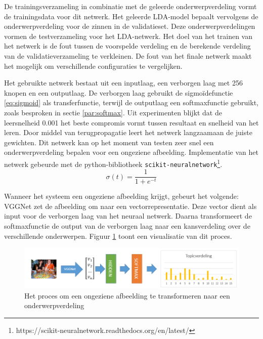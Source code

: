 De trainingsverzameling in combinatie met de geleerde onderwerpverdeling vormt de trainingsdata voor dit netwerk. 
Het geleerde LDA-model bepaalt vervolgens de onderwerpverdeling voor de zinnen in de validatieset. Deze onderwerpverdelingen vormen de testverzameling voor het LDA-netwerk. Het doel van het trainen van het netwerk is de fout tussen de voorspelde verdeling en de berekende verdeling van de validatieverzameling te verkleinen. De fout van het finale netwerk maakt het mogelijk om verschillende configuraties te vergelijken.

Het gebruikte netwerk bestaat uit een inputlaag, een verborgen laag met 256 knopen en een outputlaag. De verborgen laag gebruikt de sigmo\"idefunctie \eqref{eq:sigmoid} als transferfunctie, terwijl de outputlaag een softmaxfunctie gebruikt, zoals besproken in sectie \ref{par:softmax}. Uit experimenten blijkt dat de leersnelheid 0.001 het beste compromis vormt tussen resultaat en snelheid van het leren.
Door middel van terugpropagatie leert het netwerk langzaamaan de juiste gewichten. Dit netwerk kan op het moment van testen zeer snel een onderwerpverdeling bepalen voor een ongeziene afbeelding. Implementatie van het netwerk gebeurde met de python-bibliotheek \texttt{scikit-neuralnetwork}\footnote{https://scikit-neuralnetwork.readthedocs.org/en/latest/}.
\begin{equation}
\sigma(t) = \frac{1}{1 + e^{-t}}
\label{eq:sigmoid}
\end{equation}

Wanneer het systeem een ongeziene afbeelding krijgt, gebeurt het volgende: VGGNet zet de afbeelding om naar een vectorrepresentatie. Deze vector dient als input voor de verborgen laag van het neuraal netwerk. Daarna transformeert de softmaxfunctie de output van de verborgen laag naar een kansverdeling over de verschillende onderwerpen. Figuur \ref{fig:learningLDA} toont een visualisatie van dit proces.


\begin{figure}[tb]
    \centering
    \includegraphics[width=\linewidth]{Images/LDANetwerk.PNG}
    \caption{Het proces om een ongeziene afbeelding te transformeren naar een onderwerpverdeling}
    \label{fig:learningLDA}
\end{figure}

